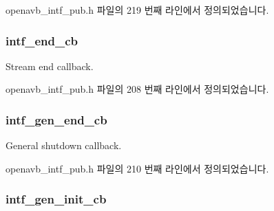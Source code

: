 openavb\+\_\+intf\+\_\+pub.\+h 파일의 219 번째 라인에서 정의되었습니다.

\subsubsection[{\texorpdfstring{intf\+\_\+end\+\_\+cb}{intf_end_cb}}]{ intf\+\_\+end\+\_\+cb}\hypertarget{structopenavb__intf__cb__t_a438129d3c775eb25b490437fb5d43fbe}{}\label{structopenavb__intf__cb__t_a438129d3c775eb25b490437fb5d43fbe}


Stream end callback. 



openavb\+\_\+intf\+\_\+pub.\+h 파일의 208 번째 라인에서 정의되었습니다.

\subsubsection[{\texorpdfstring{intf\+\_\+gen\+\_\+end\+\_\+cb}{intf_gen_end_cb}}]{ intf\+\_\+gen\+\_\+end\+\_\+cb}\hypertarget{structopenavb__intf__cb__t_af5c808e5bf832dc6f7d8314c80892171}{}\label{structopenavb__intf__cb__t_af5c808e5bf832dc6f7d8314c80892171}


General shutdown callback. 



openavb\+\_\+intf\+\_\+pub.\+h 파일의 210 번째 라인에서 정의되었습니다.

\subsubsection[{\texorpdfstring{intf\+\_\+gen\+\_\+init\+\_\+cb}{intf_gen_init_cb}}]{ intf\+\_\+gen\+\_\+init\+\_\+cb}\hypertarget{structopenavb__intf__cb__t_abdfcb6b35075220160046e97e8c51b34}{}\label{structopenavb__intf__cb__t_abdfcb6b35075220160046e97e8c51b34}


